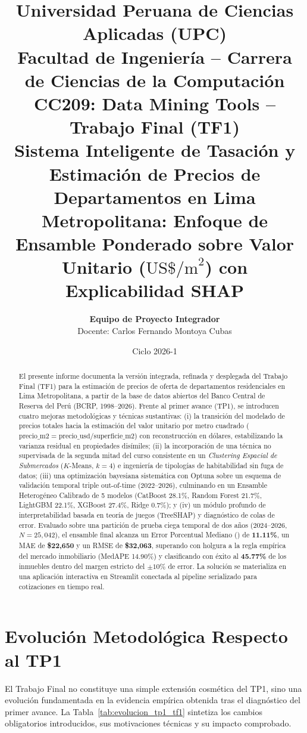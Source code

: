 \documentclass[11pt,a4paper]{article}
\title{\vspace{-1.5cm}\textbf{Universidad Peruana de Ciencias Aplicadas (UPC)}\\
\large Facultad de Ingeniería -- Carrera de Ciencias de la Computación\\
\vspace{0.3cm}
\Large \textbf{CC209: Data Mining Tools -- Trabajo Final (TF1)}\\
\vspace{0.4cm}
\LARGE \textbf{Sistema Inteligente de Tasación y Estimación de Precios de Departamentos en Lima Metropolitana: Enfoque de Ensamble Ponderado sobre Valor Unitario ($\text{US\$/m}^2$) con Explicabilidad SHAP}}
\author{\textbf{Equipo de Proyecto Integrador}\\
Docente: Carlos Fernando Montoya Cubas}
\date{Ciclo 2026-1}
\begin{document}
\maketitle

\begin{abstract}
El presente informe documenta la versión integrada, refinada y desplegada del Trabajo Final (TF1) para la estimación de precios de oferta de departamentos residenciales en Lima Metropolitana, a partir de la base de datos abiertos del Banco Central de Reserva del Perú (BCRP, 1998--2026). Frente al primer avance (TP1), se introducen cuatro mejoras metodológicas y técnicas sustantivas: (i) la transición del modelado de precios totales hacia la estimación del valor unitario por metro cuadrado ($\text{precio\_m2} = \text{precio\_usd} / \text{superficie\_m2}$) con reconstrucción en dólares, estabilizando la varianza residual en propiedades disímiles; (ii) la incorporación de una técnica no supervisada de la segunda mitad del curso consistente en un \textit{Clustering Espacial de Submercados} ($K$-Means, $k=4$) e ingeniería de tipologías de habitabilidad sin fuga de datos; (iii) una optimización bayesiana sistemática con Optuna sobre un esquema de validación temporal triple out-of-time (2022--2026), culminando en un Ensamble Heterogéneo Calibrado de 5 modelos (CatBoost 28.1\%, Random Forest 21.7\%, LightGBM 22.1\%, XGBoost 27.4\%, Ridge 0.7\%); y (iv) un módulo profundo de interpretabilidad basada en teoría de juegos (TreeSHAP) y diagnóstico de colas de error. Evaluado sobre una partición de prueba ciega temporal de dos años (2024--2026, $N=25,042$), el ensamble final alcanza un Error Porcentual Mediano () de \textbf{11.11\%}, un MAE de \textbf{\$22,650} y un RMSE de \textbf{\$32,063}, superando con holgura a la regla empírica del mercado inmobiliario (MedAPE 14.90\%) y clasificando con éxito al \textbf{45.77\%} de los inmuebles dentro del margen estricto del $\pm 10\%$ de error. La solución se materializa en una aplicación interactiva en Streamlit conectada al pipeline serializado para cotizaciones en tiempo real.
\end{abstract}

\vspace{0.3cm}

\section{Evolución Metodológica Respecto al TP1}

El Trabajo Final no constituye una simple extensión cosmética del TP1, sino una evolución fundamentada en la evidencia empírica obtenida tras el diagnóstico del primer avance. La Tabla~\ref{tab:evolucion_tp1_tf1} sintetiza los cambios obligatorios introducidos, sus motivaciones técnicas y su impacto comprobado.
\end{document}

